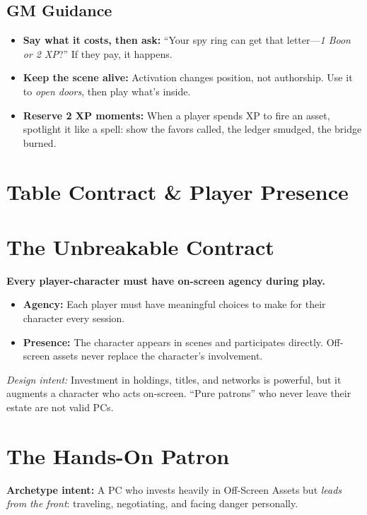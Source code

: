 \documentclass[12pt]{book}
\begin{document}
\subsection*{GM Guidance}
\begin{itemize}
  \item \textbf{Say what it costs, then ask:} ``Your spy ring can get that letter—\emph{1 Boon or 2 XP}?'' If they pay, it happens.
  \item \textbf{Keep the scene alive:} Activation changes position, not authorship. Use it to \emph{open doors}, then play what’s inside.
  \item \textbf{Reserve 2 XP moments:} When a player spends XP to fire an asset, spotlight it like a spell: show the favors called, the ledger smudged, the bridge burned.
\end{itemize}

\section{Table Contract \& Player Presence}

\section{The Unbreakable Contract}
\textbf{Every player-character must have on-screen agency during play.}
\begin{itemize}
  \item \textbf{Agency:} Each player must have meaningful choices to make for their character every session.
  \item \textbf{Presence:} The character appears in scenes and participates directly. Off-screen assets never replace the character’s involvement.
\end{itemize}
\noindent
\textit{Design intent:} Investment in holdings, titles, and networks is powerful, but it augments a character who acts on-screen. “Pure patrons” who never leave their estate are not valid PCs.

\section{The Hands-On Patron}
\textbf{Archetype intent:} A PC who invests heavily in Off-Screen Assets but \emph{leads from the front}: traveling, negotiating, and facing danger personally.
\end{document}
